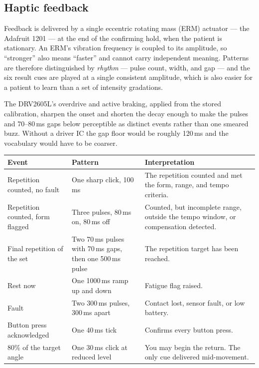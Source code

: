 \documentclass[11pt]{article}
\begin{document}
\subsection{Haptic feedback}

Feedback is delivered by a single eccentric rotating mass (ERM) actuator ---
the Adafruit 1201 --- at the end of the confirming hold, when the patient is
stationary. An ERM's vibration frequency is coupled to its amplitude, so
``stronger'' also means ``faster'' and cannot carry independent meaning.
Patterns are therefore distinguished by \emph{rhythm} --- pulse count, width,
and gap --- and the six result cues are played at a single consistent
amplitude, which is also easier for a patient to learn than a set of intensity
gradations.

\medskip
\noindent
The DRV2605L's overdrive and active braking, applied from the stored
calibration, sharpen the onset and shorten the decay enough to make the pulses
and 70--80\,ms gaps below perceptible as distinct events rather than one
smeared buzz. Without a driver IC the gap floor would be roughly 120\,ms and
the vocabulary would have to be coarser.

\begin{table}[H]
\centering\small
\begin{tabularx}{\linewidth}{@{}p{38mm} p{42mm} X@{}}
\toprule
\textbf{Event} & \textbf{Pattern} & \textbf{Interpretation} \\
\midrule
Repetition counted, no fault &
One sharp click, 100\,ms &
The repetition counted and met the form, range, and tempo criteria. \\[3pt]
Repetition counted, form flagged &
Three pulses, 80\,ms on, 80\,ms off &
Counted, but incomplete range, outside the tempo window, or compensation
detected. \\[3pt]
Final repetition of the set &
Two 70\,ms pulses with 70\,ms gaps, then one 500\,ms pulse &
The repetition target has been reached. \\[3pt]
Rest now &
One 1000\,ms ramp up and down &
Fatigue flag raised. \\[3pt]
Fault &
Two 300\,ms pulses, 300\,ms apart &
Contact lost, sensor fault, or low battery. \\[3pt]
Button press acknowledged &
One 40\,ms tick &
Confirms every button press. \\[3pt]
80\% of the target angle &
One 30\,ms click at reduced level &
You may begin the return. The only cue delivered mid-movement. \\
\bottomrule
\end{tabularx}
\end{table}
\end{document}
